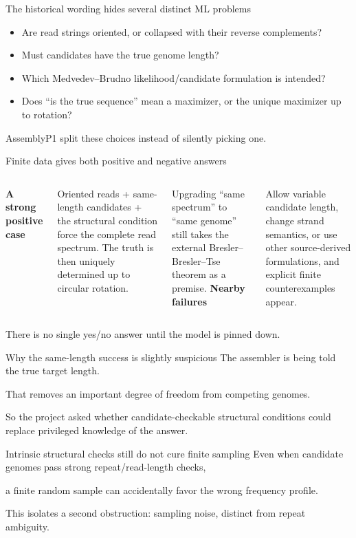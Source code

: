 \documentclass[aspectratio=169]{beamer}
\begin{document}
\begin{frame}{The historical wording hides several distinct ML problems}
\begin{itemize}
\item Are read strings oriented, or collapsed with their reverse complements?
\item Must candidates have the true genome length?
\item Which Medvedev--Brudno likelihood/candidate formulation is intended?
\item Does ``is the true sequence'' mean a maximizer, or the unique maximizer up to rotation?
\end{itemize}
\vfill
\alert{AssemblyP1 split these choices instead of silently picking one.}
\end{frame}

\begin{frame}{Finite data gives both positive and negative answers}
\begin{columns}[T]
\textbf{A strong positive case}\par\medskip
Oriented reads + same-length candidates + the structural condition force the complete read spectrum. The truth is then uniquely determined up to circular rotation.\par\smallskip
{\small Upgrading ``same spectrum'' to ``same genome'' still takes the external Bresler--Bresler--Tse theorem as a premise.}
\textbf{Nearby failures}\par\medskip
Allow variable candidate length, change strand semantics, or use other source-derived formulations, and explicit finite counterexamples appear.
\end{columns}
\vfill
\alert{There is no single yes/no answer until the model is pinned down.}
\end{frame}

\begin{frame}{Why the same-length success is slightly suspicious}
\centering
\Large The assembler is being told the true target length.\par\bigskip
\normalsize That removes an important degree of freedom from competing genomes.\par\medskip
So the project asked whether candidate-checkable structural conditions could replace privileged knowledge of the answer.
\end{frame}

\begin{frame}{Intrinsic structural checks still do not cure finite sampling}
\centering
\Large Even when candidate genomes pass strong repeat/read-length checks,\par\medskip
\alert{a finite random sample can accidentally favor the wrong frequency profile.}\par\bigskip
\normalsize This isolates a second obstruction: sampling noise, distinct from repeat ambiguity.
\end{frame}
\end{document}

